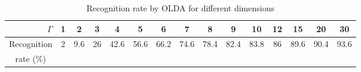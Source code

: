 \begin{table}[htbp]
  \centering
  \caption{Recognition rate by OLDA for different dimensions}
    \tabcolsep=0.11cm
    \begin{tabular}{rcccccccccccccc}
    \toprule
        $\Gamma$  & 1     & 2     & 3     & 4     & 5     & 6     & 7     & 8     & 9     & 10    & 12    & 15    & 20    & 30 \\
    \midrule
    \multicolumn{1}{c}{Recognition} & \multirow{2}[2]{*}{2} & \multirow{2}[2]{*}{9.6} & \multirow{2}[2]{*}{26} & \multirow{2}[2]{*}{42.6} & \multirow{2}[2]{*}{56.6} & \multirow{2}[2]{*}{66.2} & \multirow{2}[2]{*}{74.6} & \multirow{2}[2]{*}{78.4} & \multirow{2}[2]{*}{82.4} & \multirow{2}[2]{*}{83.8} & \multirow{2}[2]{*}{86} & \multirow{2}[2]{*}{89.6} & \multirow{2}[2]{*}{90.4} & \multirow{2}[2]{*}{93.6} \\
    \multicolumn{1}{c}{rate (\%)} &       &       &       &       &       &       &       &       &       &       &       &       &       &  \\
    \bottomrule
    \end{tabular}%
  \label{tab:experiment:gamma}%
\end{table}%
